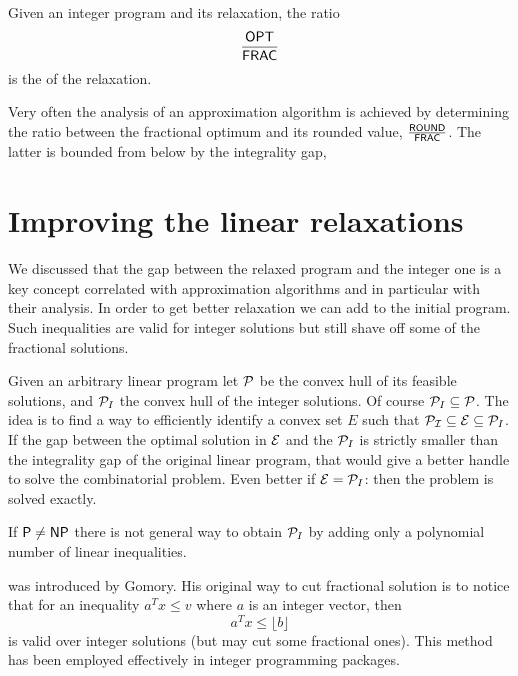 \documentclass[a4paper,twoside,justified]{tufte-handout}
\begin{document}
\begin{definition}
  Given an integer program and its relaxation, the ratio 
\begin{equation}
  \frac{\mathsf{OPT}}{\mathsf{FRAC}}
\end{equation}
is the  of the relaxation.
\end{definition}

Very often the analysis of an approximation algorithm is achieved by
determining the ratio between the fractional optimum and its rounded
value, $ \frac{\mathsf{ROUND}}{\mathsf{FRAC}} $. The latter is bounded from below by
the integrality gap, 

\section{Improving the linear relaxations}

We discussed that the gap between the relaxed program and the integer
one is a key concept correlated with approximation algorithms and in
particular with their analysis. In order to get better relaxation we
can add  to the initial
program. Such inequalities are valid for integer solutions but still
shave off some of the fractional solutions.

Given an arbitrary linear program let $ \mathcal{P}$ be the convex hull of
its feasible solutions, and $ \mathcal{P}_{I} $ the convex hull of the
integer solutions. Of course $ \mathcal{P}_{I}\subseteq\mathcal{P} $. The
idea is to find a way to efficiently identify a convex set $ E $ such
that $ \mathcal{P_{I}}\subseteq \mathcal{E} \subseteq\mathcal{P}_{I} $. 
If the gap between the optimal solution in $ \mathcal{E} $
and the $ \mathcal{P}_{I} $ is strictly smaller than the integrality gap of the
original linear program, that would give a better handle to solve the
combinatorial problem. Even better if $ \mathcal{E}=\mathcal{P}_{I} $: then
the problem is solved exactly.

If $ \mathsf{P}\neq\mathsf{NP} $ there is not general way to obtain $\mathcal{P}_{I} $
by adding only a polynomial number of linear inequalities.

 was introduced by
Gomory\cite{gomory1958outline}. His original way to cut fractional
solution is to notice that for an inequality $ a^{T}x \leq v $
where $ a $ is an integer vector, then 
\begin{equation}
  a^{T}x \leq \lfloor b \rfloor
\end{equation}
is valid over integer solutions (but may cut some fractional
ones). This method has been employed effectively in integer
programming packages.
\end{document}
